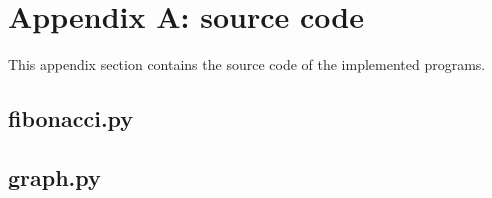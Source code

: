 \documentclass[runningheads]{llncs}
\begin{document}
\section{Appendix A: source code}\label{appendix}
This appendix section contains the source code of the implemented programs.

\subsection{fibonacci.py}\label{fibonacci_code}


\subsection{graph.py}\label{graph_code}

\end{document}
